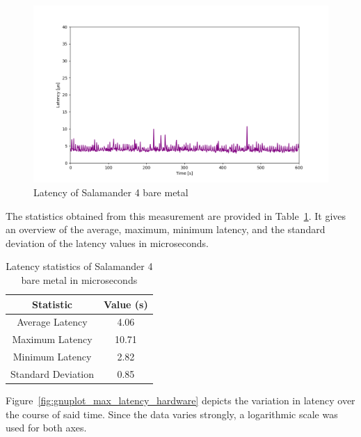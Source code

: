 \documentclass[MMR,Master,english]{twbook}
\begin{document}
\begin{figure}[H]
	\centering
	\includegraphics[width=1.0\columnwidth]{img/max_latency_hardware.png}
	\caption[Latency of Salamander 4 bare metal]{Latency of Salamander 4 bare metal}
	\label{fig:max_latency_hardware}
\end{figure}

\noindent The statistics obtained from this measurement are provided in Table~\ref{tab:latency_statistics_bare_metal}. It gives an overview of the average, maximum, minimum latency, and the standard deviation of the latency values in microseconds. 

\begin{table}[h]
	\centering
	\caption{Latency statistics of Salamander 4 bare metal in microseconds}
	\label{tab:latency_statistics_bare_metal}
	\begin{tabular}{|c|c|}\hline
	\textbf{Statistic} & \textbf{Value (\textmu s)} \\\hline
	Average Latency & 4.06 \\\hline
	Maximum Latency & 10.71 \\\hline
	Minimum Latency & 2.82 \\\hline
	Standard Deviation & 0.85 \\\hline
	\end{tabular}
	\end{table}

\noindent Figure~\ref{fig:gnuplot_max_latency_hardware} depicts the variation in latency over the course of said time. Since the data varies strongly, a logarithmic scale was used for both axes.
\end{document}
